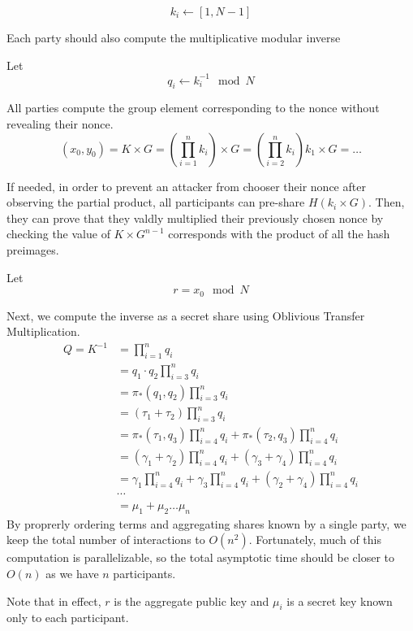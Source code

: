 \documentclass{article}
\newcommand{\mulOT}{\pi_{*}}
\begin{document}
$$k_i \leftarrow [1, N-1]$$

Each party should also compute the multiplicative modular inverse

Let $$q_i \leftarrow k_i^{-1} \mod N$$


All parties compute the group element corresponding to the nonce without revealing their nonce.
$$(x_0, y_0) = K \times G = \left(\prod_{i=1}^n  k_i\right) \times G = \left(\prod_{i=2}^n k_i\right) k_1 \times G = \ldots$$

If needed, in order to prevent an attacker from chooser their nonce after observing the partial product, all participants can pre-share
$H(k_i \times G)$. Then, they can prove that they valdly multiplied their previously chosen nonce by checking the value of 
$K\times G^{n-1}$ corresponds with the product of all the hash preimages.

Let $$ r = x_0 \mod N $$

Next, we compute the inverse as a secret share using Oblivious Transfer Multiplication.
\begin{equation*}
    \begin{split}
        Q = K^{-1} &= \prod_{i=1}^n q_i \\
        &= q_1\cdot q_2  \prod_{i=3}^n q_i\\ 
        &= \mulOT(q_1, q_2) \prod_{i=3}^n q_i \\
        &= (\tau_1 + \tau_2) \prod_{i=3}^n q_i \\
        &= \mulOT(\tau_1, q_3) \prod_{i=4}^n q_i + \mulOT(\tau_2, q_3) \prod_{i=4}^n q_i \\
        &= (\gamma_1 + \gamma_2) \prod_{i=4}^n q_i + (\gamma_3 + \gamma_4) \prod_{i=4}^n q_i\\
        &= \gamma_1  \prod_{i=4}^n q_i+ \gamma_3  \prod_{i=4}^n q_i+ (\gamma_2 + \gamma_4) \prod_{i=4}^n q_i \\
        &\cdots \\
        &= \mu_1 + \mu_2 \ldots \mu_n
    \end{split}
\end{equation*}
 By proprerly ordering terms and aggregating shares known by a single party, we keep the total number of interactions to $O(n^2)$. Fortunately, much of this computation is parallelizable, so the total asymptotic time should be closer to $O(n)$ as we have $n$ participants.


Note that in effect, $r$ is the aggregate public key and $\mu_i$ is a secret key known only to each participant.
\end{document}
